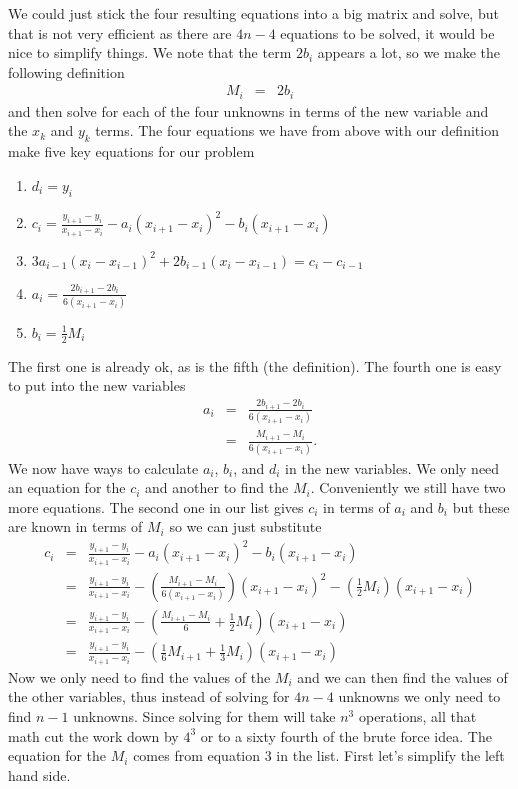 We could just stick the four resulting equations into a big matrix and solve, but that is not very efficient as there are $4n-4$ equations to be solved, it would be nice to simplify things.  We note that the term $2b_i$ appears a lot, so we make the following definition
\begin{eqnarray}
M_i &=& 2b_i
\end{eqnarray}
and then solve for each of the four unknowns in terms of the new variable and the $x_k$ and $y_k$ terms.  The four equations we have from above with our definition make five key equations for our problem
\begin{enumerate}
\item $d_i=y_i$
\item $c_i=\frac{y_{i+1}-y_i}{x_{i+1}-x_i}-a_i(x_{i+1}-x_i)^2-b_i(x_{i+1}-x_i)$
\item $3a_{i-1}(x_i-x_{i-1})^2+2b_{i-1}(x_i-x_{i-1})=c_i-c_{i-1}$
\item $a_i=\frac{2b_{i+1}-2b_i}{6(x_{i+1}-x_i)}$
\item $b_i=\frac{1}{2}M_i$
\end{enumerate}
The first one is already ok, as is the fifth (the definition).  The fourth one is easy to put into the new variables
\begin{eqnarray}
a_i
&=&\frac{2b_{i+1}-2b_i}{6(x_{i+1}-x_i)}\\
&=&\frac{M_{i+1}-M_i}{6(x_{i+1}-x_i)}.
\end{eqnarray}
We now have ways to calculate $a_i$, $b_i$, and $d_i$ in the new variables.  We only need an equation for the $c_i$ and another to find the $M_i$.  Conveniently we still have two more equations.  The second one in our list gives $c_i$ in terms of $a_i$ and $b_i$ but these are known in terms of $M_i$ so we can just substitute
\begin{eqnarray}
c_i
&=&\frac{y_{i+1}-y_i}{x_{i+1}-x_i}-a_i(x_{i+1}-x_i)^2-b_i(x_{i+1}-x_i)\\
&=&\frac{y_{i+1}-y_i}{x_{i+1}-x_i}-\left(\frac{M_{i+1}-M_i}{6(x_{i+1}-x_i)}\right)(x_{i+1}-x_i)^2-\left(\frac{1}{2}M_i\right)(x_{i+1}-x_i)\\
&=&\frac{y_{i+1}-y_i}{x_{i+1}-x_i}-\left(\frac{M_{i+1}-M_i}{6}+\frac{1}{2}M_i\right)(x_{i+1}-x_i)\\
&=&\frac{y_{i+1}-y_i}{x_{i+1}-x_i}-\left(\frac{1}{6}M_{i+1}+\frac{1}{3}M_i\right)(x_{i+1}-x_i)
\end{eqnarray}
Now we only need to find the values of the $M_i$ and we can then find the values of the other variables, thus instead of solving for $4n-4$ unknowns we only need to find $n-1$ unknowns.  Since solving for them will take $n^3$ operations, all that math cut the work down by $4^3$ or to a sixty fourth of the brute force idea.  The equation for the $M_i$ comes from equation 3 in the list.  First let's simplify the left hand side.
